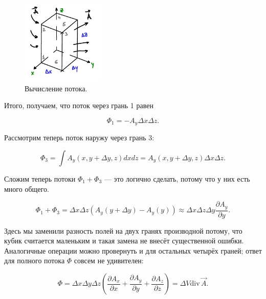 \documentclass[11pt,a4paper]{article}
\numberwithin{equation}{section}
\newcommand{\pt}{\partial}
\renewcommand{\div}{\mathrm{div}\,}
\begin{document}
\begin{figure}
  \vspace{-1.2cm}
  \begin{center}
    \includegraphics[width=4cm,height=4cm]{div.pdf}
  \end{center}
  \vspace{-0.7cm}
  \caption{Вычисление потока.}
  \label{fig:div}
  \vspace{2cm}
\end{figure}

Итого, получаем, что поток через грань 1 равен

\begin{equation}
  \Phi_1 = - A_y \Delta x \Delta z. 
\end{equation}

Рассмотрим теперь поток наружу через грань 3:

\begin{equation}
  \Phi_3 = \int A_y (x,y + \Delta y,z) dx dz = A_y (x,y+\Delta y,z)
  \Delta x \Delta z.
\end{equation}

Сложим теперь потоки $\Phi_1 + \Phi_3$ --- это логично сделать, потому
что у них есть много общего. 

\begin{equation}
  \label{eq:theorem_divergence_2}
  \Phi_1 + \Phi_3 = \Delta x \Delta z \left(A_y(y+\Delta y) - A_y
    (y)\right) \approx \Delta x \Delta z \Delta y \frac{\pt A_y}{\pt y}.
\end{equation}

Здесь мы заменили разность полей на двух гранях производной потому,
что кубик считается маленьким и такая замена не внесёт существенной
ошибки. Аналогичные операции можно провернуть и для остальных четырёх
граней; ответ для полного потока $\Phi$ совсем не удивителен:

\begin{equation}
  \label{eq:theorem_divergence_3}
  \Phi = \Delta x \Delta y \Delta z
  \left(
    \frac{\pt A_x}{\pt x} + 
    \frac{\pt A_y}{\pt y} + 
    \frac{\pt A_z}{\pt z}
  \right) = \Delta V \div \vec{A}. 
\end{equation}
\end{document}
